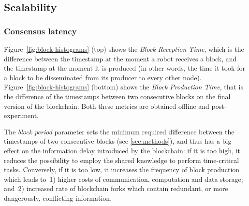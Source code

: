 \documentclass[runningheads]{llncs}
\begin{document}


\subsection{Scalability}
\label{subsec:scalability}

\subsubsection{Consensus latency}

 Figure~\ref{fig:block-histograms} (top) shows the \emph{Block Reception Time}, which is the difference between the timestamp at the moment a robot receives a block, and the timestamp at the moment it is produced (in other words, the time it took for a block to be disseminated from its producer to every other node). Figure~\ref{fig:block-histograms} (bottom) shows the \emph{Block Production Time}, that is the difference of the timestamps between two consecutive blocks on the final version of the blockchain. Both these metrics are obtained offline and post-experiment.
 
The \emph{block period} parameter sets the minimum required difference between the timestamps of two consecutive blocks (see \ref{sec:methods}), and thus has a big effect on the information delay introduced by the blockchain: if it is too high, it reduces the possibility to employ the shared knowledge to perform time-critical tasks. Conversely, if it is too low, it increases the frequency of block production which leads to~1) higher costs of communication, computation and data storage; and~2) increased rate of blockchain forks which contain redundant, or more dangerously, conflicting information.
 
\end{document}
